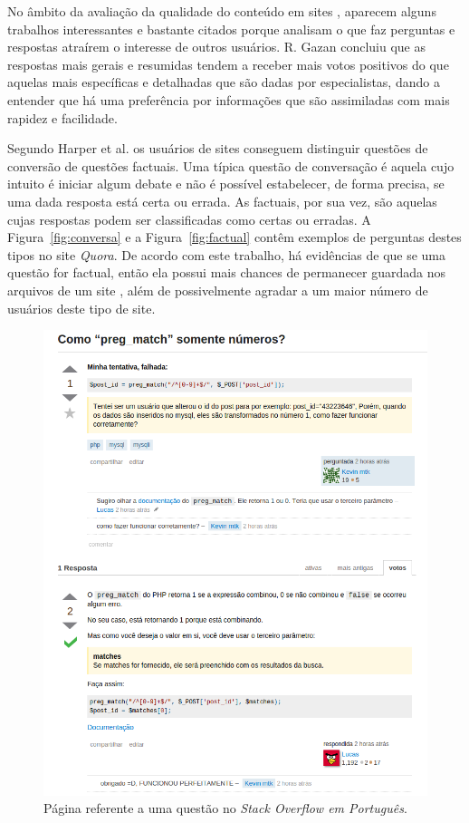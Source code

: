 No âmbito da avaliação da qualidade do conteúdo em sites \qanospace, aparecem alguns trabalhos interessantes e bastante citados porque analisam o que faz perguntas e respostas atraírem o interesse de outros usuários. R. Gazan \cite{gazan2006specialists} concluiu que as respostas mais gerais e resumidas tendem a receber mais votos positivos do que aquelas mais específicas e detalhadas que são dadas por especialistas, dando a entender que há uma preferência por informações que são assimiladas com mais rapidez e facilidade.

Segundo  Harper et al. \cite{harper2009facts} os usuários de sites \qa conseguem distinguir questões de conversão de questões factuais. Uma típica questão de conversação é aquela cujo intuito é iniciar algum debate e não é possível estabelecer, de forma precisa, se uma dada resposta está certa ou errada. As factuais, por sua vez, são aquelas cujas respostas podem ser classificadas como certas ou erradas. A Figura~\ref{fig:conversa} e a Figura~\ref{fig:factual} contêm exemplos de perguntas destes tipos no site \textit{Quora}. De acordo com este trabalho, há evidências de que se uma questão for factual, então ela possui mais chances de permanecer guardada nos arquivos de um site \qanospace, além de possivelmente agradar a um maior número de usuários deste tipo de site.

    \begin{figure}[H]
        \center
        \includegraphics[scale=.5]{./figuras/exemplo-so-pt.png}
        \caption{Página referente a uma questão no \textit{Stack Overflow em Português}.}
        \label{fig:perguntasopt}
    \end{figure}


